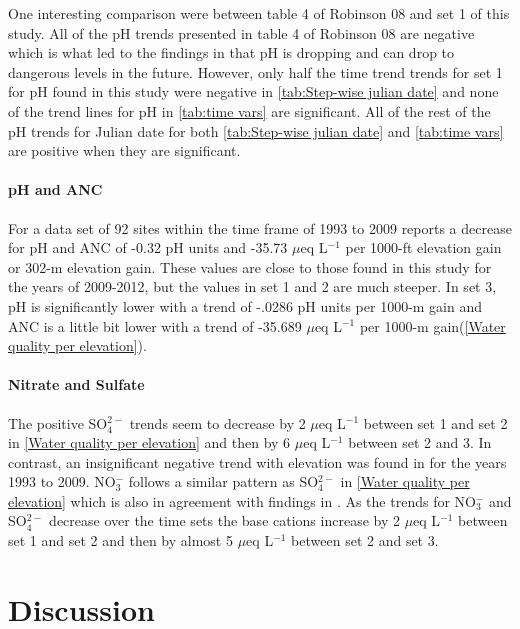 One interesting comparison were between table 4 of Robinson 08 and set 1 of this study. All of the pH trends presented in table 4 of Robinson 08 are negative which is what led to the findings in \citet{robinson2008ph} that pH is dropping and can drop to dangerous levels in the future. However, only half the time trend trends for set 1 for pH found in this study were negative in \autoref{tab:Step-wise julian date} and none of the trend lines for pH in \autoref{tab:time vars} are significant. All of the rest of the pH trends for Julian date for both \autoref{tab:Step-wise julian date} and \autoref{tab:time vars} are positive when they are significant.

\paragraph{pH and ANC}
For a data set of 92 sites within the time frame of 1993 to 2009 \citet{cai2012} reports a decrease for pH and ANC of -0.32 pH units and -35.73 $\mu$eq L$^{-1}$ per 1000-ft elevation gain or 302-m elevation gain.  These values are close to those found in this study for the years of 2009-2012, but the values in set 1 and 2 are much steeper.  In set 3, pH is significantly lower with a trend of -.0286 pH units per 1000-m gain and ANC is a little bit lower with a trend of -35.689 $\mu$eq L$^{-1}$ per 1000-m gain(\autoref{Water quality per elevation}).  

\paragraph{Nitrate and Sulfate}
The positive SO$_4^{2-}$ trends seem to decrease by 2 $\mu$eq L$^{-1}$ between set 1 and set 2 in \autoref{Water quality per elevation} and then by 6  $\mu$eq L$^{-1}$ between set 2 and 3.  In contrast, an insignificant negative trend with elevation was found in \citet{cai2012} for the years 1993 to 2009.  NO$_3^-$ follows a similar pattern as SO$_4^{2-}$ in \autoref{Water quality per elevation} which is also in agreement with findings in \citet{weathers2006}.  As the trends for  NO$_3^-$ and SO$_4^{2-}$ decrease over the time sets the base cations increase by 2 $\mu$eq L$^{-1}$ between set 1 and set 2 and then by almost 5 $\mu$eq L$^{-1}$ between set 2 and set 3.

\section{Discussion}

